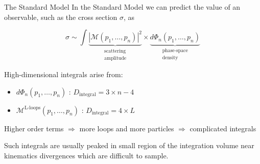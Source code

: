 \documentclass[t,handout,professionalfont,serif]{beamer}
\begin{document}

\begin{frame}{The Standard Model}
	\scriptsize
	In the Standard Model we can predict the value of an observable, such as the cross section $\sigma$, as 
	\vspace{0.3cm}
	
	\begin{equation}
		\sigma \sim \int  \underbrace{|\mathcal{M}(p_1,\dots, p_n)|^2}_{\substack{\text{scattering} \\ \text{amplitude}}} \times \underbrace{d\Phi_n(p_1,\dots, p_n)}_{\substack{\text{phase-space}\\ \text{density}}}  
	\end{equation}
\vspace{0.5cm}

High-dimensional integrals arise from:
\begin{itemize}
	\item  $d\Phi_n(p_1,\dots, p_n) $  :  $D_\text{integral} = 3 \times n - 4$ 
	\item $\mathcal{M}^{\text{L-loops}}(p_1,\dots, p_n)$ :  $D_\text{integral} = 4 \times L$ 
\end{itemize}
\vspace{1cm}

Higher order terms $\Longrightarrow$ more loops and more particles $\Longrightarrow$ complicated integrals 

Such integrals are usually peaked in small region of the integration volume near kinematics divergences which are difficult to sample.
\end{frame}
\end{document}
